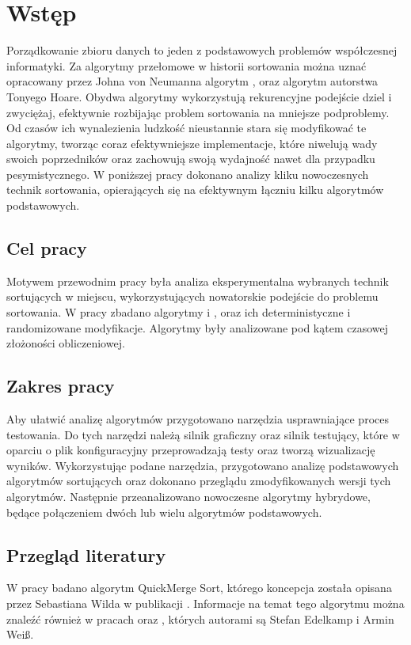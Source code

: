 \chapter{Wstęp}
\thispagestyle{chapterBeginStyle}

Porządkowanie zbioru danych to jeden z podstawowych problemów współczesnej informatyki. Za algorytmy przełomowe w historii sortowania można uznać opracowany przez Johna von Neumanna algorytm , oraz algorytm   autorstwa Tonyego Hoare.
Obydwa algorytmy wykorzystują rekurencyjne podejście dziel i zwyciężaj, efektywnie rozbijając problem sortowania na mniejsze podproblemy. Od czasów ich wynalezienia ludzkość nieustannie stara się modyfikować te algorytmy, tworząc coraz efektywniejsze implementacje, które niwelują wady swoich poprzedników oraz zachowują swoją wydajność nawet dla przypadku pesymistycznego. W poniższej pracy dokonano analizy kliku nowoczesnych technik sortowania, opierających się na efektywnym łączniu kilku algorytmów podstawowych.\\

\section{Cel pracy}
Motywem przewodnim pracy była analiza eksperymentalna wybranych technik sortujących w miejscu, wykorzystujących nowatorskie podejście do problemu sortowania. W pracy zbadano algorytmy  i , oraz ich deterministyczne i randomizowane modyfikacje. Algorytmy były analizowane pod kątem czasowej złożoności obliczeniowej.\\

\section{Zakres pracy}
Aby ułatwić analizę algorytmów przygotowano narzędzia usprawniające proces testowania. Do tych narzędzi należą silnik graficzny oraz silnik testujący, które w oparciu o plik konfiguracyjny przeprowadzają testy oraz tworzą wizualizację wyników.
Wykorzystując podane narzędzia, przygotowano analizę podstawowych algorytmów sortujących oraz dokonano przeglądu zmodyfikowanych wersji tych algorytmów. Następnie przeanalizowano nowoczesne algorytmy hybrydowe, będące połączeniem dwóch lub wielu algorytmów podstawowych.\\

\section{Przegląd literatury}
W pracy badano algorytm QuickMerge Sort, którego koncepcja została opisana przez Sebastiana Wilda w publikacji . Informacje na temat tego algorytmu można znaleźć również w pracach  oraz , których autorami są Stefan Edelkamp i Armin Weiß.\\

